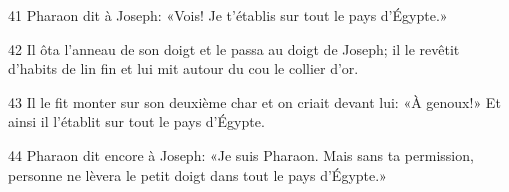 
41 Pharaon dit à Joseph: «Vois! Je t’établis sur tout le pays d’Égypte.»

42 Il ôta l’anneau de son doigt et le passa au doigt de Joseph; il le revêtit d’habits de lin fin et lui mit autour du cou le collier d’or.

43 Il le fit monter sur son deuxième char et on criait devant lui: «À genoux!» Et ainsi il l’établit sur tout le pays d’Égypte.

44 Pharaon dit encore à Joseph: «Je suis Pharaon. Mais sans ta permission, personne ne lèvera le petit doigt dans tout le pays d’Égypte.»